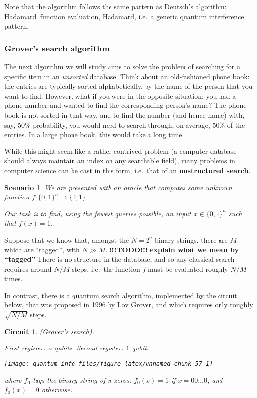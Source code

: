 \documentclass[fleqn]{article}
\newtheorem*{scenario}{Scenario}
\newtheorem*{circuit}{Circuit}
\begin{document}
Note that the algorithm follows the same pattern as Deutsch's algorithm: Hadamard, function evaluation, Hadamard, i.e.~a generic quantum interference pattern.

\hypertarget{grovers-search-algorithm}{%
\subsubsection{Grover's search algorithm}\label{grovers-search-algorithm}}

The next algorithm we will study aims to solve the problem of searching for a specific item in an \emph{unsorted} database.
Think about an old-fashioned phone book: the entries are typically sorted alphabetically, by the name of the person that you want to find.
However, what if you were in the opposite situation: you had a phone number and wanted to find the corresponding person's name?
The phone book is not sorted in that way, and to find the number (and hence name) with, say, 50\% probability, you would need to search through, on average, 50\% of the entries.
In a large phone book, this would take a long time.

While this might seem like a rather contrived problem (a computer database should always maintain an index on any searchable field), many problems in computer science can be cast in this form, i.e.~that of an \textbf{unstructured search}.

\begin{scenario}

We are presented with an oracle that computes some unknown function \(f\colon\{0,1\}^n\to\{0,1\}\).

Our task is to find, using the fewest queries possible, an input \(x\in\{0,1\}^n\) such that \(f(x)=1\).

\end{scenario}

Suppose that we know that, amongst the \(N=2^n\) binary strings, there are \(M\) which are ``tagged'', with \(N\gg M\).
\textbf{!!!TODO!!! explain what we mean by ``tagged''}
There is no structure in the database, and so any classical search requires around \(N/M\) steps, i.e.~the function \(f\) must be evaluated roughly \(N/M\) times.

In contrast, there is a quantum search algorithm, implemented by the circuit below, that was proposed in 1996 by Lov Grover, and which requires only roughly \(\sqrt{N/M}\) steps.

\begin{circuit}

(Grover's search).

\emph{First register: \(n\) qubits. Second register: \(1\) qubit.}

\begin{center}\texttt{[image: quantum-info\_files/figure-latex/unnamed-chunk-57-1]} \end{center}

where \(f_0\) tags the binary string of \(n\) zeros: \(f_0(x)=1\) if \(x=00\ldots0\), and \(f_0(x)=0\) otherwise.

\end{circuit}
\end{document}
